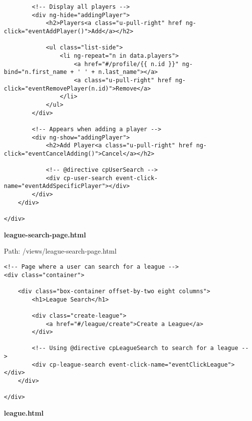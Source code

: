 {\begin{lstlisting}
		<!-- Display all players -->
		<div ng-hide="addingPlayer">
			<h2>Players<a class="u-pull-right" href ng-click="eventAddPlayer()">Add</a></h2>

			<ul class="list-side">
				<li ng-repeat="n in data.players">
					<a href="#/profile/{{ n.id }}" ng-bind="n.first_name + ' ' + n.last_name"></a>
					<a class="u-pull-right" href ng-click="eventRemovePlayer(n.id)">Remove</a>
				</li>
			</ul>
		</div>

		<!-- Appears when adding a player -->
		<div ng-show="addingPlayer">
			<h2>Add Player<a class="u-pull-right" href ng-click="eventCancelAdding()">Cancel</a></h2>

			<!-- @directive cpUserSearch -->
			<div cp-user-search event-click-name="eventAddSpecificPlayer"></div>
		</div>
	</div>

</div>\end{lstlisting}
}
\textbf{league-search-page.html}

Path: /views/league-search-page.html
{\scriptsize
\begin{lstlisting}
<!-- Page where a user can search for a league -->
<div class="container">

	<div class="box-container offset-by-two eight columns">
		<h1>League Search</h1>

		<div class="create-league">
			<a href="#/league/create">Create a League</a>
		</div>

		<!-- Using @directive cpLeagueSearch to search for a league -->
		<div cp-league-search event-click-name="eventClickLeague"></div>
	</div>

</div>\end{lstlisting}
}
\textbf{league.html}

